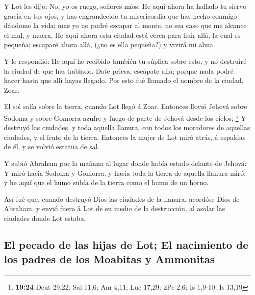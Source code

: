  Y Lot les dijo: No, yo os ruego, señores míos;
 He aquí ahora ha hallado tu siervo gracia en tus ojos, y
has engrandecido tu misericordia que has hecho conmigo dándome la vida;
mas yo no podré escapar al monte, no sea caso que me alcance el mal, y
muera.  He aquí ahora esta ciudad está cerca para huir
allá, la cual es pequeña; escaparé ahora allá, (¿no es ella pequeña?) y
vivirá mi alma.

 Y le respondió: He aquí he recibido también tu súplica
sobre esto, y no destruiré la ciudad de que has hablado. 
Date priesa, escápate allá; porque nada podré hacer hasta que allí hayas
llegado. Por esto fué llamado el nombre de la ciudad, Zoar.

 El sol salía sobre la tierra, cuando Lot llegó á Zoar.
 Entonces llovió Jehová sobre Sodoma y sobre Gomorra
azufre y fuego de parte de Jehová desde los cielos; \footnote{\textbf{19:24}
  Deut 29,22; Sal 11,6; Am 4,11; Luc 17,29; 2Pe 2,6; Is 1,9-10; Is 13,19}
 Y destruyó las ciudades, y toda aquella llanura, con
todos los moradores de aquellas ciudades, y el fruto de la tierra.
 Entonces la mujer de Lot miró atrás, á espaldas de él, y
se volvió estatua de sal.

 Y subió Abraham por la mañana al lugar donde había
estado delante de Jehová:  Y miró hacia Sodoma y Gomorra,
y hacia toda la tierra de aquella llanura miró; y he aquí que el humo
subía de la tierra como el humo de un horno.

 Así fué que, cuando destruyó Dios las ciudades de la
llanura, acordóse Dios de Abraham, y envió fuera á Lot de en medio de la
destrucción, al asolar las ciudades donde Lot estaba.

\hypertarget{el-pecado-de-las-hijas-de-lot-el-nacimiento-de-los-padres-de-los-moabitas-y-ammonitas}{%
\subsection{El pecado de las hijas de Lot; El nacimiento de los padres
de los Moabitas y
Ammonitas}\label{el-pecado-de-las-hijas-de-lot-el-nacimiento-de-los-padres-de-los-moabitas-y-ammonitas}}

